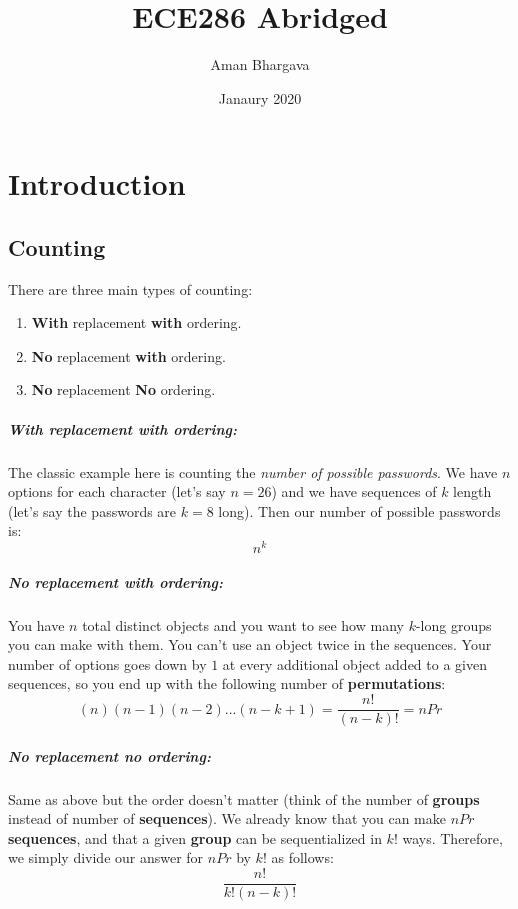 \documentclass[a4paper,12pt]{report}
\begin{document}
\title{ECE286 Abridged}
\author{Aman Bhargava}
\date{Janaury 2020}
\maketitle

\tableofcontents

\chapter{Introduction}
\section{Counting}
There are three main types of counting:
\begin{enumerate}
\item \textbf{With} replacement \textbf{with} ordering.
\item \textbf{No} replacement \textbf{with} ordering.
\item \textbf{No} replacement \textbf{No} ordering.
\end{enumerate}
\paragraph{With replacement with ordering: } The classic example here is counting the \textit{number of possible passwords}.
We have $n$ options for each character (let's say $n = 26$) and we have sequences of $k$ length (let's say the passwords are $k = 8$ long).
Then our number of possible passwords is: $$n^k$$

\paragraph{No replacement with ordering: } You have $n$ total distinct objects and you want to see how many $k$-long groups you can make 
with them. You can't use an object twice in the sequences. Your number of options goes down by $1$ at every additional object added 
to a given sequences, so you end up with the following number of \textbf{permutations}:
$$(n)(n-1)(n-2)...(n-k+1) = \frac{n!}{(n-k)!} = nPr$$

\paragraph{No replacement no ordering: } Same as above but the order doesn't matter (think of the number of \textbf{groups} instead 
of number of \textbf{sequences}). We already know that you can make $nPr$ \textbf{sequences}, and that a given \textbf{group} can be 
sequentialized in $k!$ ways. Therefore, we simply divide our answer for $nPr$ by $k!$ as follows:
$$\frac{n!}{k!(n-k)!}$$
\end{document}
